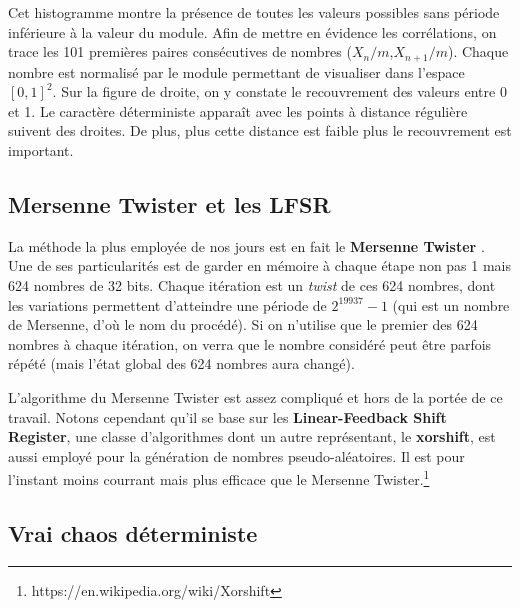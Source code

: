 \documentclass{scrartcl}
\begin{document}
Cet histogramme montre la présence de toutes les valeurs possibles sans période
inférieure à la valeur du module.  Afin de mettre en évidence les corrélations,
on trace les 101 premières paires consécutives de nombres
($X_n/m$,$X_{n+1}/m$). Chaque nombre est normalisé par le module permettant de
visualiser dans l'espace $[0,1]^2$.  Sur la figure de droite, on y constate le
recouvrement des valeurs entre 0 et 1. Le caractère déterministe apparaît avec
les points à distance régulière suivent des droites. De plus, plus cette
distance est faible plus le recouvrement est important.

\subsection{Mersenne Twister et les LFSR}\label{s:MT}
La méthode la plus employée de nos jours est en fait le \textbf{Mersenne
  Twister} \cite{MT}. Une de ses particularités est de garder en mémoire à
chaque étape non pas 1 mais 624 nombres de 32 bits. Chaque itération est un
\textit{twist} de ces 624 nombres, dont les variations permettent d'atteindre
une période de $2^{19937}-1$ (qui est un nombre de Mersenne, d'où le nom du
procédé). Si on n'utilise que le premier des 624 nombres à chaque itération, on
verra que le nombre considéré peut être parfois répété (mais l'état global des
624 nombres aura changé).

L'algorithme du Mersenne Twister est assez compliqué et hors de la portée de ce
travail. Notons cependant qu'il se base sur les  \textbf{Linear-Feedback Shift
  Register}, une classe d'algorithmes dont un autre représentant, le
\textbf{xorshift}, est aussi employé pour la génération de nombres
pseudo-aléatoires. Il est pour l'instant moins courrant mais plus efficace que
le Mersenne Twister.\footnote{https://en.wikipedia.org/wiki/Xorshift}

\subsection{Vrai chaos déterministe}
\end{document}
